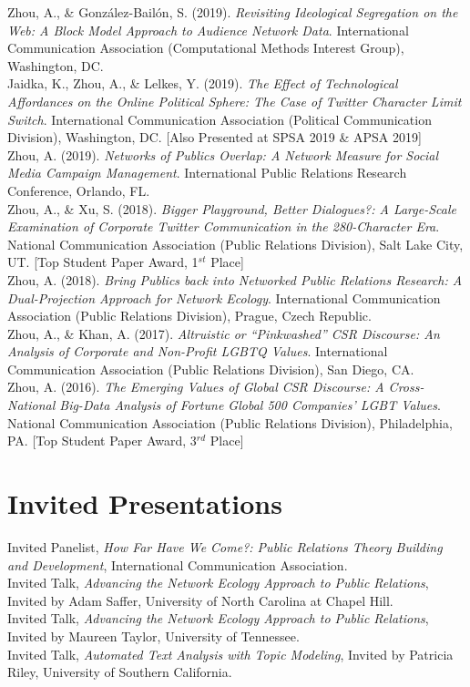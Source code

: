 \documentclass[12pt, letterpaper]{article}
\newcommand{\years}[1]{\marginnote{\normalsize #1}}
\begin{document}
  \years{[7]} Zhou, A., \& González-Bailón, S. (2019). \textit{Revisiting Ideological Segregation on the Web: A Block Model Approach to Audience Network Data}. International Communication Association (Computational Methods Interest Group), Washington, DC.\\
  \years{[6]} Jaidka, K., Zhou, A., \& Lelkes, Y. (2019). \textit{The Effect of Technological Affordances on the Online Political Sphere: The Case of Twitter Character Limit Switch}. International Communication Association (Political Communication Division), Washington, DC. [Also Presented at SPSA 2019 \& APSA 2019]\\
  \years{[5]} Zhou, A. (2019). \textit{Networks of Publics Overlap: A Network Measure for Social Media Campaign Management}. International Public Relations Research Conference, Orlando, FL.\\
  \years{[4]} Zhou, A., \& Xu, S. (2018). \textit{Bigger Playground, Better Dialogues?: A Large-Scale Examination of Corporate Twitter Communication in the 280-Character Era}. National Communication Association (Public Relations Division), Salt Lake City, UT. [Top Student Paper Award, 1$^{st}$ Place]\\
  \years{[3]} Zhou, A. (2018). \textit{Bring Publics back into Networked Public Relations Research: A Dual-Projection Approach for Network Ecology}. International Communication Association (Public Relations Division), Prague, Czech Republic.\\
  \years{[2]} Zhou, A., \& Khan, A. (2017). \textit{Altruistic or ``Pinkwashed'' CSR Discourse: An Analysis of Corporate and Non-Profit LGBTQ Values}. International Communication Association (Public Relations Division), San Diego, CA.\\
  \years{[1]} Zhou, A. (2016). \textit{The Emerging Values of Global CSR Discourse: A Cross-National Big-Data Analysis of Fortune Global 500 Companies' LGBT Values}. National Communication Association (Public Relations Division), Philadelphia, PA. [Top Student Paper Award, 3$^{rd}$ Place]

\section*{Invited Presentations}

  \years{2019} Invited Panelist, \textit{How Far Have We Come?: Public Relations Theory Building and Development}, International Communication Association.\\
  \years{2019} Invited Talk, \textit{Advancing the Network Ecology Approach to Public Relations}, Invited by Adam Saffer, University of North Carolina at Chapel Hill.\\
  \years{2019} Invited Talk, \textit{Advancing the Network Ecology Approach to Public Relations}, Invited by Maureen Taylor, University of Tennessee.\\
  \years{2016} Invited Talk, \textit{Automated Text Analysis with Topic Modeling}, Invited by Patricia Riley, University of Southern California.
\end{document}
